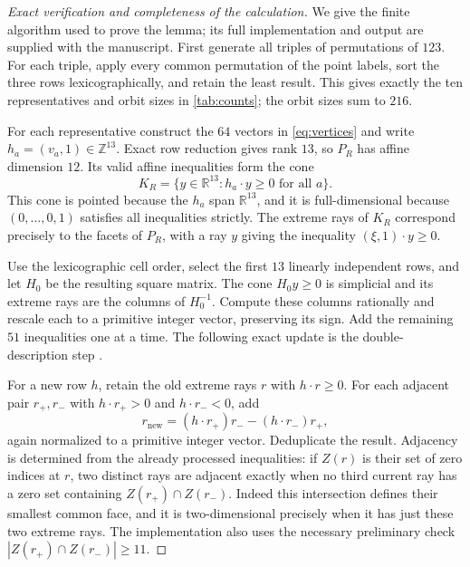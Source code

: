 \documentclass[a4paper,11pt]{amsart}
\numberwithin{equation}{section}
\theoremstyle{definition}
\theoremstyle{remark}
\newcommand{\R}{\mathbb R}
\begin{document}
\begin{proof}[Exact verification and completeness of the calculation]
We give the finite algorithm used to prove the lemma; its full implementation
and output are supplied with the manuscript.
First generate all triples of permutations of $123$. For each triple,
apply every common permutation of the point labels, sort the three rows
lexicographically, and retain the least result. This gives exactly the
ten representatives and orbit sizes in \cref{tab:counts}; the orbit sizes
sum to $216$.

For each representative construct the $64$ vectors in \eqref{eq:vertices}
and write $h_a=(v_a,1)\in\mathbb Z^{13}$. Exact row reduction gives rank
$13$, so $P_R$ has affine dimension $12$. Its valid affine inequalities
form the cone
\begin{equation}
 K_R=\{y\in\R^{13}:h_a\cdot y\geq0\text{ for all }a\}.
 \label{eq:dual-cone}
\end{equation}
This cone is pointed because the $h_a$ span $\R^{13}$, and it is
full-dimensional because $(0,\ldots,0,1)$ satisfies all inequalities
strictly. The extreme rays of $K_R$ correspond precisely to the facets
of $P_R$, with a ray $y$ giving the inequality $(\xi,1)\cdot y\geq0$.

Use the lexicographic cell order, select the first $13$ linearly
independent rows, and let $H_0$ be the resulting square matrix. The cone
$H_0y\geq0$ is simplicial and its extreme rays are the columns of
$H_0^{-1}$. Compute these columns rationally and rescale each to a
primitive integer vector, preserving its sign. Add the remaining
$51$ inequalities one at a time. The following exact
update is the double-description step \cite{FukudaProdon1996}.

For a new row $h$, retain the old extreme rays $r$ with $h\cdot r\geq0$.
For each adjacent pair $r_+,r_-$ with $h\cdot r_+>0$ and
$h\cdot r_-<0$, add
\begin{equation}
 r_{\mathrm{new}}=(h\cdot r_+)r_--(h\cdot r_-)r_+,
 \label{eq:dd-update}
\end{equation}
again normalized to a primitive integer vector. Deduplicate the result.
Adjacency is determined from the already processed inequalities: if
$Z(r)$ is their set of zero indices at $r$, two distinct rays are adjacent
exactly when no third current ray has a zero set containing
$Z(r_+)\cap Z(r_-)$. Indeed this intersection defines their smallest
common face, and it is two-dimensional precisely when it has just these
two extreme rays. The implementation also uses the necessary preliminary
check $|Z(r_+)\cap Z(r_-)|\geq11$.


\end{proof}
\end{document}
